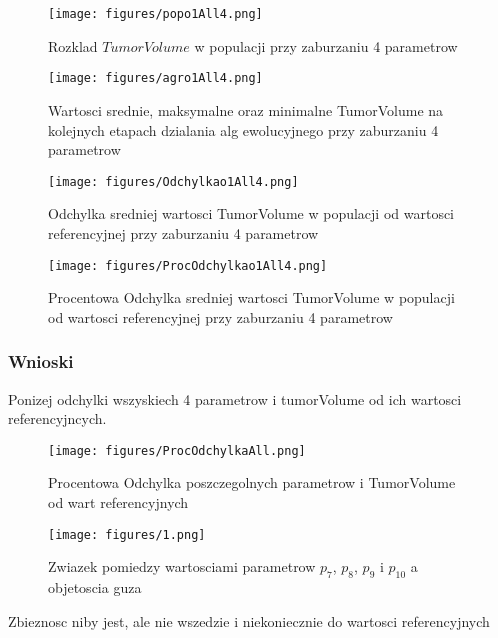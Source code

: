 \documentclass[]{article}
\begin{document}
\begin{figure}[htbp]
\centering
\texttt{[image: figures/popo1All4.png]}
\caption{Rozklad \(TumorVolume\) w populacji przy zaburzaniu 4
parametrow}
\end{figure}

\begin{figure}[htbp]
\centering
\texttt{[image: figures/agro1All4.png]}
\caption{Wartosci srednie, maksymalne oraz minimalne TumorVolume na
kolejnych etapach dzialania alg ewolucyjnego przy zaburzaniu 4
parametrow}
\end{figure}

\begin{figure}[htbp]
\centering
\texttt{[image: figures/Odchylkao1All4.png]}
\caption{Odchylka sredniej wartosci TumorVolume w populacji od wartosci
referencyjnej przy zaburzaniu 4 parametrow}
\end{figure}

\begin{figure}[htbp]
\centering
\texttt{[image: figures/ProcOdchylkao1All4.png]}
\caption{Procentowa Odchylka sredniej wartosci TumorVolume w populacji
od wartosci referencyjnej przy zaburzaniu 4 parametrow}
\end{figure}

\newpage

\subsubsection{Wnioski}\label{wnioski}

Ponizej odchylki wszyskiech 4 parametrow i tumorVolume od ich wartosci
referencyjncych.

\begin{figure}[htbp]
\centering
\texttt{[image: figures/ProcOdchylkaAll.png]}
\caption{Procentowa Odchylka poszczegolnych parametrow i TumorVolume od
wart referencyjnych}
\end{figure}

\begin{figure}[htbp]
\centering
\texttt{[image: figures/1.png]}
\caption{Zwiazek pomiedzy wartosciami parametrow \(p_7\), \(p_8\),
\(p_9\) i \(p_{10}\) a objetoscia guza}
\end{figure}

\newpage

Zbieznosc niby jest, ale nie wszedzie i niekoniecznie do wartosci
referencyjnych
\end{document}
